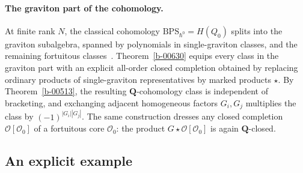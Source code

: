 \documentclass[11pt]{article}
\numberwithin{equation}{section}
\numberwithin{figure}{section}
\numberwithin{table}{section}
\begin{document}
\paragraph{The graviton part of the cohomology.}\label{the-graviton-part-of-the-cohomology}
At finite rank $N$, the classical cohomology $\mathrm{BPS}_{\hbar^0}=H(Q_0)$ splits into the graviton subalgebra, spanned by polynomials in single-graviton classes, and the remaining fortuitous classes~\cite{microstates}. Theorem~\ref{b-00630} equips every class in the graviton part with an explicit all-order closed completion obtained by replacing ordinary products of single-graviton representatives by marked products $\star$. By Theorem~\ref{b-00513}, the resulting $\mathbf Q$-cohomology class is independent of bracketing, and exchanging adjacent homogeneous factors $G_i,G_j$ multiplies the class by $(-1)^{|G_i||G_j|}$. The same construction dresses any closed completion $\mathcal O[\mathcal O_0]$ of a fortuitous core $\mathcal O_0$: the product $G\star\mathcal O[\mathcal O_0]$ is again $\mathbf Q$-closed.

\subsection{An explicit example}\label{sec-graviton-example}
\end{document}
